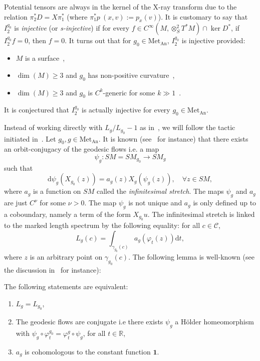 \documentclass[AHL,Unicode,longabstracts,published]{cedram}
\newcommand{\R}{\mathbb{R}}
\newcommand{\bfun}{\mathbf{1}}
\newcommand{\mc}{\mathcal}
\newcommand{\dd}{\mathrm{d}}
\newcommand{\Met}{\mathrm{Met}}
\newcommand{\An}{\mathrm{An}}
\let\oldforall\forall
\renewcommand*{\forall}{\mathrel{\oldforall}}
\begin{document}
Potential tensors are always in the kernel of the X-ray transform due to the relation $\pi_2^*D = X \pi_1^*$ (where $\pi_1^* p~(x,v) := p_x(v)$). It is customary to say that $I^{g_0}_2$ is \emph{injective} (or \emph{s-injective}) if for every $f\in C^\infty(M, \otimes^2_S T^\ast M) \cap \ker D^*$, if $I^{g_0}_2 f = 0$, then $f=0$. It turns out that for $g_0\in \Met_{\An}$, $I^{g_0}_2$ is injective provided:
\begin{itemize}
\item $M$ is a surface~\cite{Paternain-Salo-Uhlmann-14-1,Guillarmou-17-1},
\item $\dim(M)\geq 3$ and $g_0$ has non-positive curvature~\cite{Croke-Sharafutdinov-98},
\item $\dim(M)\geq 3$ and $g_0$ is $C^k$-generic for some $k\gg1$~\cite{Cekic-Lefeuvre-21}.
\end{itemize}
It is conjectured that $I^{g_0}_2$ is actually injective for every $g_0 \in \Met_{\An}$.

Instead of working directly with $L_g/L_{g_0}-1$ as in~\cite{Guillarmou-Lefeuvre-18}, we will follow the tactic initiated in~\cite{Guillarmou-Knieper-Lefeuvre-19}. Let $g_0, g\in \Met_{\An}$. It is known (see~\cite[Appendix~B]{Guillarmou-Knieper-Lefeuvre-19} for instance) that there exists an orbit-conjugacy of the geodesic flows i.e. a map
\[
\psi_g : SM=SM_{g_0} \rightarrow SM_g
\]
such that
\[
\dd \psi_{g}(X_{g_0}(z)) = a_g(z) X_g(\psi_g(z)),\quad\forall z \in SM,
\]
where $a_g$ is a function on $SM$ called the \emph{infinitesimal stretch}. The maps $\psi_g$ and $a_g$ are just $C^\nu$ for some $\nu > 0$. The map $\psi_g$ is not unique and $a_g$ is only defined up to a coboundary, namely a term of the form $X_{g_0} u$. The infinitesimal stretch is linked to the marked length spectrum by the following equality: for all $c \in \mc{C}$,
\[
L_g(c) = \int_{\gamma_{g_0}(c)} a_g(\varphi_t(z)) \dd t,
\]
where $z$ is an arbitrary point on $\gamma_{g_0}(c)$. The following lemma is well-known (see the discussion in~\cite[Section~2.5]{Guillarmou-Knieper-Lefeuvre-19} for instance):

\begin{lemm}
The following statements are equivalent:
\begin{enumerate}
\item $L_g = L_{g_0}$,
\item The geodesic flows are conjugate i.e there exists $\psi_g$ a H\"older homeomorphism with $\psi_g \circ \varphi_t^{g_0} = \varphi_t^g \circ \psi_g$, for all $t \in \R$,
\item $a_g$ is cohomologous to the constant function $\bfun$.
\end{enumerate}
\end{lemm}
\end{document}
